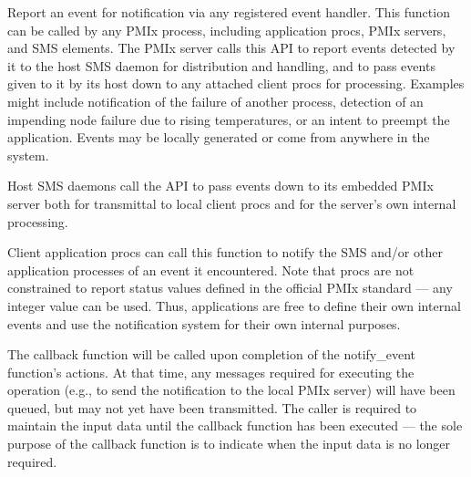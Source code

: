 \descr

Report an event for notification via any
registered event handler. This function can be called by any \ac{PMIx} process, including application procs, \ac{PMIx} servers, and \ac{SMS} elements. The \ac{PMIx} server calls this \ac{API} to report events detected
by it to the host \ac{SMS} daemon for distribution and handling, and to pass events given to it by its host down to any attached client procs for processing. Examples might include notification of the failure of another process, detection of an impending node failure due to rising temperatures, or an intent to preempt the application. Events may be locally generated or come from anywhere in the system.

Host \ac{SMS} daemons call the API to pass events down to its embedded \ac{PMIx} server both for transmittal to local client procs and for the server's own internal processing.

Client application procs can call this function to notify the \ac{SMS} and/or other application processes of an event it encountered. Note that procs are not constrained to report status values defined in the official \ac{PMIx} standard --- any integer value can be used. Thus, applications are free to define their own internal events and use the notification system for their own internal purposes.

\adviceuserstart
The callback function will be called upon completion of the
notify_event function's actions. At that time, any messages required for executing the operation (e.g., to send the notification to the local \ac{PMIx} server) will
have been queued, but may not yet have been transmitted. The caller is required to maintain the input
data until the callback function has been executed --- the sole purpose of the callback function is to indicate when the input data is no longer required.
\adviceuserend


